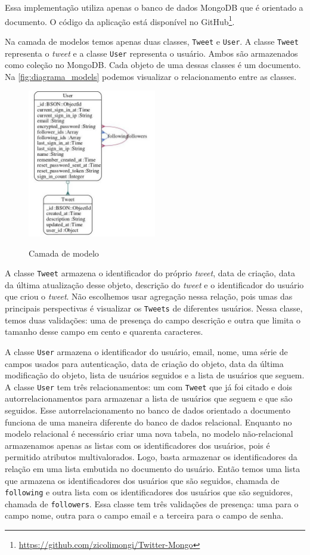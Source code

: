 Essa implementação utiliza apenas o banco de dados MongoDB que é orientado a documento. O código da aplicação está disponível no GitHub\footnote{\url{https://github.com/zicolimongi/Twitter-Mongo}}.

Na camada de modelos temos apenas duas classes, \verb|Tweet| e \verb|User|. A classe \verb|Tweet| representa o \textit{tweet} e a classe \verb|User| representa o usuário. Ambos são armazenados como coleção no MongoDB. Cada objeto de uma dessas classes é um documento. Na \autoref{fig:diagrama_models} podemos visualizar o relacionamento entre as classes.
\begin{figure}[H]
    \centering
    \caption{Camada de modelo}
    \includegraphics[width=0.5\textwidth]{./04-figuras/models_complete.jpg}
    \label{fig:diagrama_models}
\end{figure}
A classe \verb|Tweet| armazena o identificador do próprio \textit{tweet}, data de criação, data da última atualização desse objeto, descrição do \textit{tweet} e o identificador do usuário que criou o \textit{tweet}. Não escolhemos usar agregação nessa relação, pois umas das principais perspectivas é visualizar os \verb|Tweets| de diferentes usuários. Nessa classe, temos duas validações: uma de presença do campo descrição e outra que limita o tamanho desse campo em cento e quarenta caracteres.

A classe \verb|User| armazena o identificador do usuário, email, nome, uma série de campos usados para autenticação, data de criação do objeto, data da última modificação do objeto, lista de usuários seguidos e a lista de usuários que seguem. A classe \verb|User| tem três relacionamentos: um com \verb|Tweet| que já foi citado e dois autorrelacionamentos para armazenar a lista de usuários que seguem e que são seguidos. Esse autorrelacionamento no banco de dados orientado a documento funciona de uma maneira diferente do banco de dados relacional.
Enquanto no modelo relacional é necessário criar uma nova tabela, no modelo não-relacional armazenamos apenas as listas com os identificadores dos usuários, pois é permitido atributos multivalorados. Logo, basta armazenar os identificadores da relação em uma lista embutida no documento do usuário. Então temos uma lista que armazena os identificadores dos usuários que são seguidos, chamada de \verb|following| e outra lista com os identificadores dos usuários que são seguidores, chamada de \verb|followers|.
Essa classe tem três validações de presença: uma para o campo nome, outra para o campo email e a terceira para o campo de senha.

